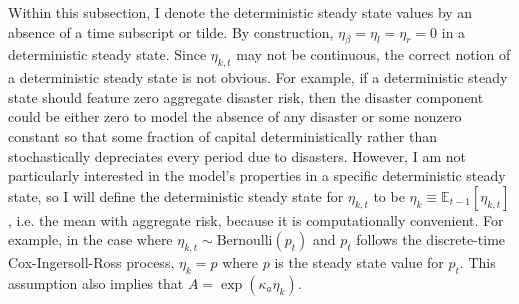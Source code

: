 \documentclass[12 pt, oneside]{article}
\theoremstyle{definition}
\theoremstyle{definition}
\theoremstyle{definition}
\newcommand{\E}{\mathbb{E}}
\begin{document}
Within this subsection, I denote the deterministic steady state values by an absence of a time subscript or tilde. By construction, $\eta_\beta = \eta_l = \eta_r = 0$ in a deterministic steady state. Since $\eta_{k, t}$ may not be continuous, the correct notion of a deterministic steady state is not obvious. For example, if a deterministic steady state should feature zero aggregate disaster risk, then the disaster component could be either zero to model the absence of any disaster or some nonzero constant so that some fraction of capital deterministically rather than stochastically depreciates every period due to disasters.  However, I am not particularly interested in the model's properties in a specific deterministic steady state, so I will define the deterministic steady state for $\eta_{k, t}$ to be $\eta_k \equiv \E_{t - 1}[\eta_{k, t}]$, i.e. the mean with aggregate risk, because it is computationally convenient. For example, in the case where $\eta_{k, t}\sim \text{Bernoulli}(p_t)$ and $p_t$ follows the discrete-time Cox-Ingersoll-Ross process, $\eta_k = p$ where $p$ is the steady state value for $p_t$. This assumption also implies that $A = \exp(\kappa_a \eta_k)$.
\end{document}

